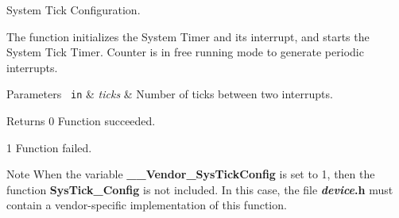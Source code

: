 System Tick Configuration. 

The function initializes the System Timer and its interrupt, and starts the System Tick Timer. Counter is in free running mode to generate periodic interrupts.


\begin{DoxyParams}[1]{Parameters}
\mbox{\texttt{ in}}  & {\em ticks} & Number of ticks between two interrupts.\\
\hline
\end{DoxyParams}
\begin{DoxyReturn}{Returns}
0 Function succeeded. 

1 Function failed.
\end{DoxyReturn}
\begin{DoxyNote}{Note}
When the variable {\bfseries{\+\_\+\+\_\+\+Vendor\+\_\+\+Sys\+Tick\+Config}} is set to 1, then the function {\bfseries{Sys\+Tick\+\_\+\+Config}} is not included. In this case, the file {\bfseries{{\itshape device}.h}} must contain a vendor-\/specific implementation of this function. 
\end{DoxyNote}
